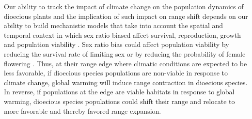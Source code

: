 \documentclass[11pt]{article}
\newcommand{\tom}[2]{{\color{red}{#1}}\footnote{\textit{\color{red}{#2}}}}
\begin{document}
Our ability to track the impact of climate change on the population dynamics of dioecious plants and the implication of such impact on range shift depends on our ability to build mechanistic models that take into account the spatial and temporal context in which sex ratio biased affect survival, reproduction,  growth and population viability \citep{davis2001range,evans2016towards,czachura2020demographic}.
Sex ratio bias could affect population viability by reducing the survival rate of limiting sex or by reducing the probability of female flowering \citep{eberhart2017sex,miller2022two}.
Thus, at their range edge where climatic conditions are expected to be less favorable, if dioecious species populations are non-viable in response to climate change, global warming will induce range contraction in dioecious species.
In reverse, if populations at the edge are viable habitats in response to global warming, dioecious species populations could shift their range and relocate to more favorable and thereby favored range expansion. 


\end{document}
